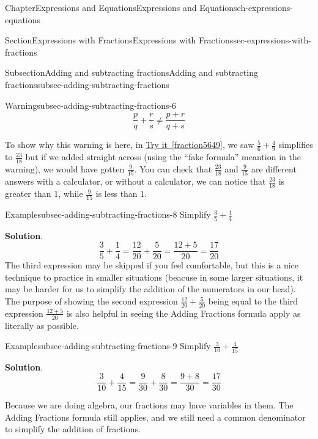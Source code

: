 \documentclass[twoside,11pt,]{book}
\newcommand{\blocktitlefont}{\relax}
\newcommand{\xreffont}{\relax}
\numberwithin{equation}{chapter}
\begin{document}
\begin{chapterptx}{Chapter}{Expressions and Equations}{}{Expressions and Equations}{}{}{ch-expressions-equations}
\begin{sectionptx}{Section}{Expressions with Fractions}{}{Expressions with Fractions}{}{}{sec-expressions-with-fractions}
\begin{subsectionptx}{Subsection}{Adding and subtracting fractions}{}{Adding and subtracting fractions}{}{}{subsec-adding-subtracting-fractions}
\begin{warning}{Warning}{}{subsec-adding-subtracting-fractions-6}%
%
\begin{equation*}
\frac{p}{q}+\frac{r}{s} \not= \frac{p+r}{q+s}
\end{equation*}
%
\end{warning}
To show why this warning is here, in \hyperref[fraction5649]{Try it~{\xreffont\ref{fraction5649}}}, we saw \(\frac56+\frac49\) simplifies to \(\frac{23}{18}\) but if we added straight across (using the ``fake formula'' meantion in the warning), we would have gotten \(\frac{9}{15}\). You can check that \(\frac{23}{18}\) and \(\frac{9}{15}\) are different answers with a calculator, or without a calculator, we can notice that \(\frac{23}{18}\) is greater than \(1\), while \(\frac{9}{15}\) is less than \(1\).%
\begin{example}{Example}{}{subsec-adding-subtracting-fractions-8}%
Simplify \(\frac35 + \frac14\)%
\par\smallskip%
\noindent\textbf{\blocktitlefont Solution}.\hypertarget{subsec-adding-subtracting-fractions-8-2}{}\quad{}%
\begin{equation*}
\frac35 + \frac14 = \frac{12}{20} + \frac{5}{20} = \frac{12+5}{20} = \frac{17}{20}
\end{equation*}
The third expression may be skipped if you feel comfortable, but this is a nice technique to practice in smaller situations (beacuse in some larger situations, it may be harder for us to simplify the addition of the numerators in our head). The purpose of showing the second expression \(\frac{12}{20}+\frac{5}{20}\) being equal to the third expression \(\frac{12+5}{20}\) is also helpful in seeing the Adding Fractions formula apply as literally as possible.%
\end{example}
\begin{example}{Example}{}{subsec-adding-subtracting-fractions-9}%
Simplify \(\frac{3}{10} + \frac{4}{15}\)%
\par\smallskip%
\noindent\textbf{\blocktitlefont Solution}.\hypertarget{subsec-adding-subtracting-fractions-9-2}{}\quad{}%
\begin{equation*}
\frac{3}{10} + \frac{4}{15} = \frac{9}{30} + \frac{8}{30} = \frac{9+8}{30} = \frac{17}{30}
\end{equation*}
%
\end{example}
Because we are doing algebra, our fractions may have variables in them. The Adding Fractions formula still applies, and we still need a common denominator to simplify the addition of fractions.%

\end{subsectionptx}
\end{sectionptx}
\end{chapterptx}
\end{document}
